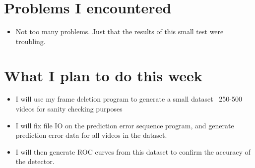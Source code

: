 \documentclass[12pt]{article}%
\def\bi{\begin{itemize}     %
\vspace{-0.5em}\setlength\itemsep{0em}}
\begin{document}
\section{Problems I encountered}
\bi
\item Not too many problems. Just that the results of this small test were troubling.
\end{itemize}

\section{What I plan to do this week}
\bi
\item I will use my frame deletion program to generate a small dataset ~250-500 videos for sanity checking purposes
\item I will fix file IO on the prediction error sequence program, and generate prediction error
data for all videos in the dataset.
\item I will then generate ROC curves from this dataset to confirm the accuracy of the detector.
\end{itemize}



\begin{comment}
\pagebreak
%


%
\end{comment}
\end{document}

